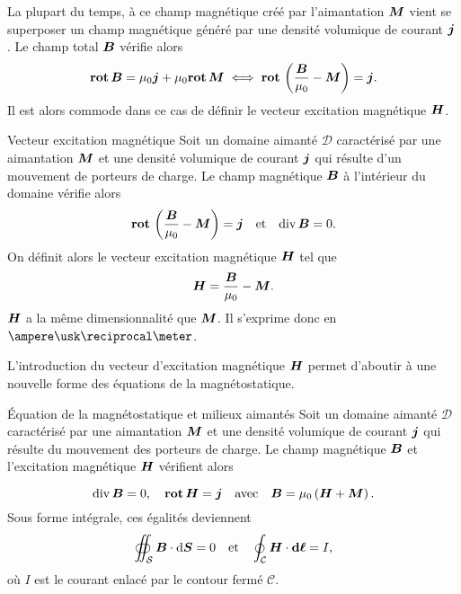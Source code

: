 La plupart du temps, à ce champ magnétique créé par l'aimantation $\vecM$ 
vient se superposer
un champ magnétique généré par une densité volumique de courant $\vecj$ . Le champ total
$\vecb$ vérifie alors
\begin{equation}
	\rot \vecb = \mu_0 \vecj + \mu_0 \rot \vecM \iff \rot\left(\dfrac{\vecb}{\mu_0} 
	- \vecM\right) = \vecj.
\end{equation}
Il est alors commode dans ce cas de définir le vecteur excitation magnétique 
$\vecH$.

\begin{defn}{Vecteur excitation magnétique}
	Soit un domaine aimanté $\mathcal{D}$ caractérisé par une aimantation 
	$\vecM$ et
	une densité volumique de courant $\vecj$ qui résulte d'un mouvement 
	de porteurs de charge. Le champ magnétique $\vecb$ 
	à l'intérieur du domaine vérifie alors
	\begin{equation*}
		\rot\left(\dfrac{\vecb}{\mu_0} - \vec{M}\right) = \vecj
		\quad \mathrm{et} \quad \div \vecb = 0.
	\end{equation*}
	On définit alors le vecteur excitation magnétique $\vecH$ tel que
	\begin{equation}
		\vecH = \dfrac{\vecb}{\mu_0} - \vec{M}.
	\end{equation}
	$\vecH$ a la même dimensionnalité que $\vecM$. Il s'exprime donc en 
	$\ampere \usk \reciprocal \meter$. 
\end{defn}	

L'introduction du vecteur d'excitation magnétique $\vecH$ permet d'aboutir
à une nouvelle forme des équations de la magnétostatique.

\begin{defn}{Équation de la magnétostatique et milieux aimantés}
	Soit un domaine aimanté $\mathcal{D}$ caractérisé par une aimantation $\vecM$ et
	une densité volumique de courant $\vecj$ qui résulte du mouvement 
	des porteurs de charge. Le champ magnétique $\vecb$ et 
	l'excitation magnétique $\vecH$ vérifient alors

\begin{equation}
		\div \vecb = 0, \quad \rot \vecH = \vecj \quad \mathrm{avec}
		\quad \vecb = \mu_0 \left(\vecH + \vecM\right).
\end{equation}
Sous forme intégrale, ces égalités deviennent
\begin{equation}
	\oiint_\mathcal{S} \vecb \cdot \ds = 0 \quad \mathrm{et} 
	\quad \oint_\mathcal{C} \vecH \cdot
	\dl = I,
\end{equation}
où $I$ est le courant enlacé par le contour fermé $\mathcal{C}$.
\end{defn}

